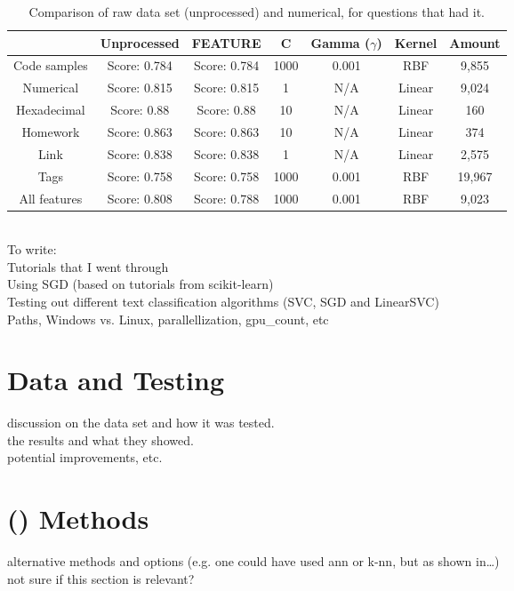 \begin{table}[tbp]
	\centering
	\begin{tabular}{| c | c | c | c | c | c | c |}
		\hline
		~				& Unprocessed		& FEATURE		& C			& Gamma ($\gamma$)	& Kernel	& Amount	 	\\ \hline
		Code samples 	& Score: 0.784		& Score: 0.784	& 1000		& 0.001				& RBF 		& 9,855 		\\ \hline
		Numerical		& Score: 0.815		& Score: 0.815	& 1			& N/A				& Linear	& 9,024			\\ \hline
		Hexadecimal		& Score: 0.88		& Score: 0.88	& 10		& N/A				& Linear	& 160 			\\ \hline
		Homework 		& Score: 0.863		& Score: 0.863	& 10		& N/A				& Linear	& 374 			\\ \hline
		Link			& Score: 0.838		& Score: 0.838	& 1			& N/A				& Linear	& 2,575			\\ \hline
		Tags			& Score: 0.758		& Score: 0.758	& 1000		& 0.001				& RBF 		& 19,967		\\ \hline
		All features	& Score: 0.808		& Score: 0.788	& 1000		& 0.001				& RBF 		& 9,023			\\ \hline
	\end{tabular}
	\caption{Comparison of raw data set (unprocessed) and numerical, for questions that had it.}
	\label{tab:comparison_of_feature_occurences_only}
\end{table}



~\\
To write: \\
Tutorials that I went through \\
Using SGD (based on tutorials from scikit-learn) \\
Testing out different text classification algorithms (SVC, SGD and LinearSVC) \\
Paths, Windows vs. Linux, parallellization, gpu\_count, etc

\section{Data and Testing}
\label{sec:data_and_testing}
discussion on the data set and how it was tested. \\
the results and what they showed.  \\
potential improvements, etc.

\section[Artificial Intelligence Methods]{ () Methods}
\label{sec:ai_methods}
alternative methods and options (e.g. one could have used ann or k-nn, but as shown in\ldots) \\
not sure if this section is relevant?

